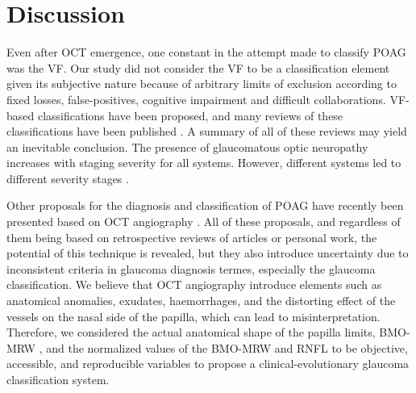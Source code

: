 \documentclass[jcm,article,submit,moreauthors,pdftex]{Definitions/mdpi}
\begin{document}
\section{Discussion}

Even after OCT emergence, one constant in the attempt made to classify POAG was the VF. Our study did not consider the VF to be a classification element given its subjective nature because of arbitrary limits of exclusion according to fixed losses, false-positives, cognitive impairment and difficult collaborations. VF-based classifications have been proposed, and many reviews of these classifications have been published \cite{germano:2017:evaluation, hirasawa:2013:modified, ng:2012:comparison}. A summary of all of these reviews may yield an inevitable conclusion. The presence of glaucomatous optic neuropathy increases with staging severity for all systems. However, different systems led to different severity stages \cite{ng:2012:comparison}.

Other proposals for the diagnosis and classification of POAG have recently been presented based on OCT angiography \cite{mansoori:2018:optical, miguel:2019:diagnostic, rabiolo:2018:comparison,  hollo:2018:optical, saba:2018:fundus}. All of these proposals, and regardless of them being based on retrospective reviews of articles \cite{saba:2018:fundus} or personal work, the potential of this technique is revealed, but they also introduce uncertainty due to inconsistent criteria in glaucoma diagnosis termes, especially the glaucoma classification. We believe that OCT angiography introduce elements such as anatomical anomalies, exudates, haemorrhages, and the distorting effect of the vessels on the nasal side of the papilla, which can lead to misinterpretation. Therefore, we considered the actual anatomical shape of the papilla limits, BMO-MRW \cite{chauhan:2013:enhanced}, and the normalized values of the BMO-MRW and RNFL to be objective, accessible, and reproducible variables to propose a clinical-evolutionary glaucoma classification system.
\end{document}
